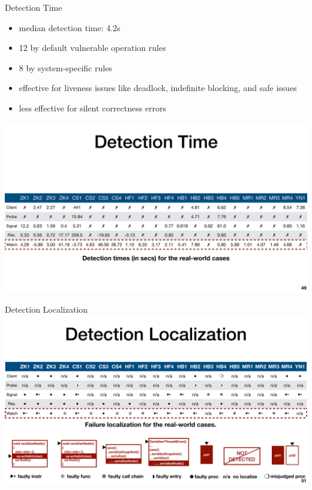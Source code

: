 \documentclass[aspectratio=169]{beamer}
\begin{document}
\begin{frame}{Detection Time}
    \begin{itemize}
        \item median detection time: 4.2s
        \item 12 by default vulnerable operation rules
        \item 8  by system-specific rules
        \item effective for liveness issues like deadlock, indefinite blocking, and safe issues
        \item less effective for silent correctness errors
    \end{itemize}
    \begin{center}
        \includegraphics[width=1\textwidth]{fig/time}
    \end{center}
\end{frame}

\begin{frame}{Detection Localization}
    \includegraphics[width=\textwidth]{fig/localization}
\end{frame}
\end{document}
